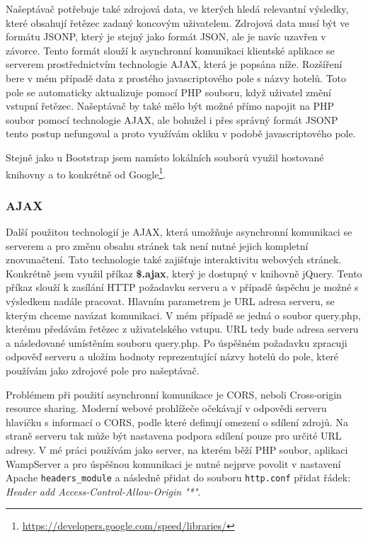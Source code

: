 \documentclass[czech,BP]{thesiskiv}
\begin{document}
Našeptávač potřebuje také zdrojová data, ve kterých hledá relevantní výsledky, které obsahují řetězec zadaný koncovým uživatelem. Zdrojová data musí být ve formátu JSONP, který je stejný jako formát JSON, ale je navíc uzavřen v závorce. Tento formát slouží k asynchronní komunikaci klientské aplikace se serverem prostřednictvím technologie AJAX, která je popsána níže. Rozšíření bere v mém případě data z prostého javascriptového pole s názvy hotelů. Toto pole se automaticky aktualizuje pomocí PHP souboru, když uživatel změní vstupní řetězec. Našeptávač by také mělo být možné přímo napojit na PHP soubor pomocí technologie AJAX, ale bohužel i přes správný formát JSONP tento postup nefungoval a proto využívám okliku v podobě javascriptového pole.


Stejně jako u Bootstrap jsem namísto lokálních souborů využil hostované knihovny a to konkrétně od Google\footnote{\url{https://developers.google.com/speed/libraries/}}.

\subsubsection{AJAX}
Další použitou technologií je AJAX, která umožňuje asynchronní komunikaci se serverem a pro změnu obsahu stránek tak není nutné jejich kompletní znovunačtení. Tato technologie také zajišťuje interaktivitu webových stránek. Konkrétně jsem využil příkaz \textbf{\$.ajax}, který je dostupný v knihovně jQuery. Tento příkaz slouží k zasílání HTTP požadavku serveru a v případě úspěchu je možné s výsledkem nadále pracovat. Hlavním parametrem je URL adresa serveru, se kterým chceme navázat komunikaci. V mém případě se jedná o soubor query.php, kterému předávám řetězec z uživatelského vstupu. URL tedy bude adresa serveru a následované umístěním souboru query.php. Po úspěšném požadavku zpracuji odpověď serveru a uložím hodnoty reprezentující názvy hotelů do pole, které používám jako zdrojové pole pro našeptávač.


Problémem při použití asynchronní komunikace je CORS, neboli Cross-origin resource sharing. Moderní webové prohlížeče očekávají v odpovědi serveru hlavičku s informací o CORS, podle které definují omezení o sdílení zdrojů. Na straně serveru tak může být nastavena podpora sdílení pouze pro určité URL adresy. V mé práci používám jako server, na kterém běží PHP soubor, aplikaci WampServer a pro úspěšnou komunikaci je nutné nejprve povolit v nastavení Apache \texttt{headers\_module} a následně přidat do souboru \texttt{http.conf} přidat řádek: \textit{Header add Access-Control-Allow-Origin "*"}.
\end{document}
